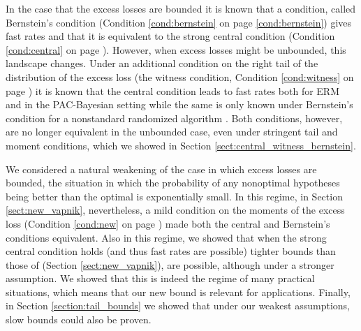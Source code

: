 \documentclass{uvamath}
\theoremstyle{remark}
\theoremstyle{definition}
\theoremstyle{definition}
\theoremstyle{definition}
\theoremstyle{definition}
\theoremstyle{definition}
\begin{document}
In the case that the excess losses are bounded it is known that a
condition, called Bernstein's condition (Condition
\ref{cond:bernstein} on page \ref{cond:bernstein}) gives fast rates
and that it is equivalent to the strong central condition (Condition
\ref{cond:central} on page \pageref{cond:central}). However, when
excess losses might be unbounded, this landscape changes. Under an
additional condition on the right tail of the distribution of the
excess loss (the witness condition, Condition \ref{cond:witness} on
page \pageref{cond:witness}) it is known that the central condition
leads to fast rates both for ERM and in the PAC-Bayesian setting
\citep{grunwald_fast_2016} while the same is only known under
Bernstein's condition for a nonstandard randomized algorithm
\citep{audibert_fast_2009}.  Both conditions, however, are no longer
equivalent in the unbounded case, even under stringent tail and moment
conditions, which we showed in Section
\ref{sect:central_witness_bernstein}.

We considered a natural weakening of the case in which excess losses
are bounded, the situation in which the probability of any nonoptimal
hypotheses being better than the optimal is exponentially small. In
this regime, in Section \ref{sect:new_vapnik}, nevertheless, a mild
condition on the moments of the excess loss (Condition \ref{cond:new}
on page \pageref{cond:new}) made both the central and Bernstein's
conditions equivalent. Also in this regime, we showed that when the
strong central condition holds (and thus fast rates are possible)
tighter bounds than those of \citet{grunwald_fast_2016} (Section
\ref{sect:new_vapnik}), are possible, although under a stronger
assumption. We showed that this is indeed the regime of many practical
situations, which means that our new bound is relevant for
applications. Finally, in Section \ref{section:tail_bounds} we showed
that under our weakest assumptions, slow bounds could also be proven.
\end{document}

